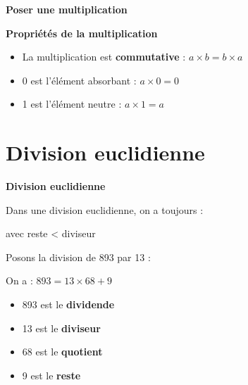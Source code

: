 \begin{methodebox}
	\textbf{Poser une multiplication}
	
	\begin{center}
	\end{center}
\end{methodebox}

\begin{proprietebox}
	\textbf{Propriétés de la multiplication}
	\begin{itemize}[label = \textbullet]
		\item La multiplication est \textbf{commutative} : $a \times b = b \times a$
		\item 0 est l'élément absorbant : $a \times 0 = 0$
		\item 1 est l'élément neutre : $a \times 1 = a$
	\end{itemize}
\end{proprietebox}

\section{Division euclidienne}

\begin{definitionbox}
	\textbf{Division euclidienne}
	
	Dans une division euclidienne, on a toujours :
	\begin{center}
	\end{center}
	avec reste < diviseur
\end{definitionbox}

\begin{examplebox}
	Posons la division de 893 par 13 :
	
	\begin{center}
	\end{center}
	
	On a : $893 = 13 \times 68 + 9$
	\begin{itemize}[label = \textbullet]
		\item 893 est le \textbf{dividende}
		\item 13 est le \textbf{diviseur}
		\item 68 est le \textbf{quotient}
		\item 9 est le \textbf{reste}
	\end{itemize}
\end{examplebox}

